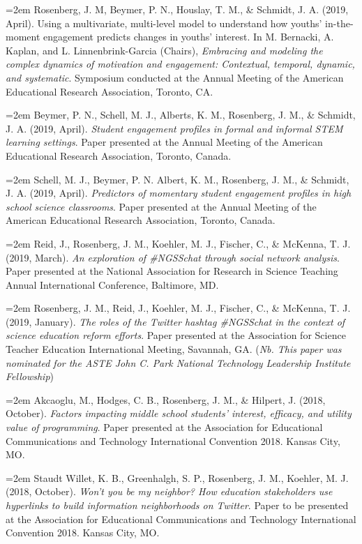 \documentclass[
  14,
]{article}
\begin{document}
\hangindent=2em Rosenberg, J. M, Beymer, P. N., Houslay, T. M., \&
Schmidt, J. A. (2019, April). Using a multivariate, multi-level model to
understand how youths' in-the-moment engagement predicts changes in
youths' interest. In M. Bernacki, A. Kaplan, and L. Linnenbrink-Garcia
(Chairs), \emph{Embracing and modeling the complex dynamics of
motivation and engagement: Contextual, temporal, dynamic, and
systematic}. Symposium conducted at the Annual Meeting of the American
Educational Research Association, Toronto, CA.

\hangindent=2em Beymer, P. N., Schell, M. J., Alberts, K. M., Rosenberg,
J. M., \& Schmidt, J. A. (2019, April). \emph{Student engagement
profiles in formal and informal STEM learning settings}. Paper presented
at the Annual Meeting of the American Educational Research Association,
Toronto, Canada.

\hangindent=2em Schell, M. J., Beymer, P. N. Albert, K. M., Rosenberg,
J. M., \& Schmidt, J. A. (2019, April). \emph{Predictors of momentary
student engagement profiles in high school science classrooms}. Paper
presented at the Annual Meeting of the American Educational Research
Association, Toronto, Canada.

\hangindent=2em Reid, J., Rosenberg, J. M., Koehler, M. J., Fischer, C.,
\& McKenna, T. J. (2019, March). \emph{An exploration of \#NGSSchat
through social network analysis}. Paper presented at the National
Association for Research in Science Teaching Annual International
Conference, Baltimore, MD.

\hangindent=2em Rosenberg, J. M., Reid, J., Koehler, M. J., Fischer, C.,
\& McKenna, T. J. (2019, January). \emph{The roles of the Twitter
hashtag \#NGSSchat in the context of science education reform efforts}.
Paper presented at the Association for Science Teacher Education
International Meeting, Savannah, GA. (\emph{Nb. This paper was nominated
for the ASTE John C. Park National Technology Leadership Institute
Fellowship})

\hangindent=2em Akcaoglu, M., Hodges, C. B., Rosenberg, J. M., \&
Hilpert, J. (2018, October). \emph{Factors impacting middle school
students' interest, efficacy, and utility value of programming}. Paper
presented at the Association for Educational Communications and
Technology International Convention 2018. Kansas City, MO.

\hangindent=2em Staudt Willet, K. B., Greenhalgh, S. P., Rosenberg, J.
M., Koehler, M. J. (2018, October). \emph{Won't you be my neighbor? How
education stakeholders use hyperlinks to build information neighborhoods
on Twitter}. Paper to be presented at the Association for Educational
Communications and Technology International Convention 2018. Kansas
City, MO.
\end{document}
